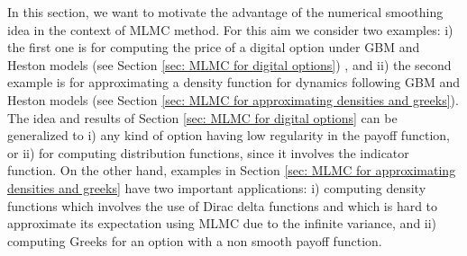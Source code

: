In this section, we want to motivate the advantage of the numerical smoothing idea in the context of MLMC method. For this aim we consider two examples: i) the first one is for computing the price of a digital option under GBM and Heston models (see Section \ref{sec: MLMC for digital options}) , and ii) the second example is for approximating a density function for dynamics following  GBM and Heston models (see Section \ref{sec: MLMC for approximating densities and greeks}). The idea and results of Section \ref{sec: MLMC for digital options}  can be generalized to i)  any kind of option having low regularity in the payoff function, or  ii) for computing distribution functions, since it involves the indicator function.  On the other hand, examples in Section \ref{sec: MLMC for approximating densities and greeks}  have two important applications: i) computing density functions which involves the use of Dirac delta functions and which is hard to approximate its expectation using MLMC due to the infinite variance, and ii) computing Greeks for an option with a non smooth payoff function.
